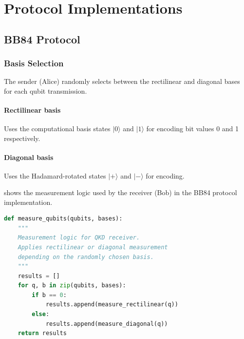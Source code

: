 \documentclass[10pt, a4paper]{report}
\newcommand{\ket}[1]{\ensuremath{|#1\rangle}}
\begin{document}

\section{Protocol Implementations}


\subsection{BB84 Protocol}

\subsubsection{Basis Selection} The sender (Alice) randomly selects
between the rectilinear and diagonal bases for each qubit transmission.

\paragraph{Rectilinear basis} Uses the computational basis states
$\ket{0}$ and $\ket{1}$ for encoding bit values 0 and 1 respectively.

\paragraph{Diagonal basis} Uses the Hadamard-rotated states
$\ket{+}$ and $\ket{-}$ for encoding.

 shows the measurement logic used by the receiver (Bob)
in the BB84 protocol implementation.

\begin{lstlisting}[language=Python, caption={BB84 receiver measurement logic.}, label={lst:measure}]
def measure_qubits(qubits, bases):
    """
    Measurement logic for QKD receiver.
    Applies rectilinear or diagonal measurement
    depending on the randomly chosen basis.
    """
    results = []
    for q, b in zip(qubits, bases):
        if b == 0:
            results.append(measure_rectilinear(q))
        else:
            results.append(measure_diagonal(q))
    return results
\end{lstlisting}
\end{document}

